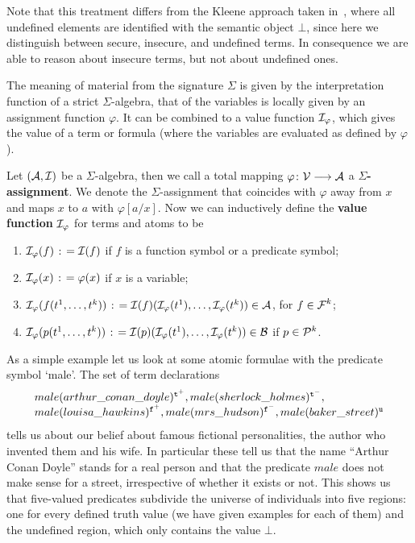 \documentclass{\filespath jancl}
\def\Vars{{\cV}}                      %
\def\Funcs{{\mbox{$\cF$}}}
\def\to{\longrightarrow}
\def\deq{{\;\colon\kern-.2em=\;}}
\def\phi{\varphi}
\def\cA{{\cal A}}\def\cB{{\cal B}}\def\cC{{\cal C}}
\def\cV{{\cal V}}\def\cW{{\cal W}}\def\cX{{\cal X}}
\let\phi\varphi
\newcommand{\undefined}{{\tt u}}
\newcommand{\twts}{{{\tt t}^+}}
\newcommand{\twfs}{{{\tt f}^+}}
\newcommand{\twti}{{{\tt t}^-}}
\newcommand{\twfi}{{{\tt f}^-}}
\newcommand{\Tval}{{\cal B}}
\def\Preds{{\cal P}}
\begin{document}
  Note that this treatment differs from the Kleene approach taken
  in~\cite{KeKo94}, where all undefined elements are identified
  with the semantic object $\bot$, since here we distinguish between
  secure, insecure, and undefined terms.  In consequence we are able
  to reason about insecure terms, but not about undefined ones.

The meaning of material from the signature $\Sigma$ is given by the
interpretation function of a strict $\Sigma$-algebra, that of the variables is
locally given by an assignment function $\phi$. It can be combined to
a value function $\cI_{\phi}$, which gives the value of a term or formula
(where the variables are evaluated as defined by $\phi$). 

\begin{definition}
  Let $(\cA,\cI)$ be a $\Sigma$-algebra, then we call a total mapping
  $\phi\colon\Vars\to\cA$ a {\bf $\Sigma$-assignment}. We denote the
  $\Sigma$-as\-sign\-ment that coincides with $\phi$ away from $x$ and
  maps $x$ to $a$ with $\phi[a/x]$.
  Now we can inductively define the {\bf value function} $\cI_\phi$ for terms
  and atoms to be
    \begin{enumerate}
  \item $\cI_\phi(f)\deq\cI(f)$ if $f$ is a function symbol or a predicate symbol;
  \item $\cI_\phi(x)\deq\phi(x)$ if $x$ is a variable;
  \item
    $\cI_\phi(f(t^1,\ldots,t^k))\deq\cI(f)(\cI_\phi(t^1),\ldots,\cI_\phi(t^k))\in\cA$,
    for $f\in\Funcs^k$;
  \item
    $\cI_\phi(p(t^1,\ldots,t^k))\deq\cI(p)(\cI_\phi(t^1),\ldots,\cI_\phi(t^k))\in\Tval$
    if $p\in\Preds^k$.
    \end{enumerate}
\end{definition}


\begin{example}\label{ex:literature}
  As a simple example let us look at some atomic formulae with the predicate
  symbol `male'. The set of term declarations
  \[\begin{array}{l}male(arthur\_conan\_doyle)^{\twts},male(sherlock\_holmes)^{\twti},\\
                    male(louisa\_hawkins)^{\twfs},male(mrs\_hudson)^{\twfi},male(baker\_street)^{\undefined}
  \end{array}\]
  tells us about our belief about famous fictional personalities, the
  author who invented them and his wife. In particular these tell us that the
  name ``Arthur Conan Doyle'' stands for a real person
  and that the predicate $\textit{male}$ does not make sense for a street, irrespective
  of whether it exists or not. This shows
  us that five-valued predicates subdivide the universe of individuals into
  five regions: one for every defined truth value (we have given examples for
  each of them) and the undefined region, which only contains the value $\bot$.
\end{example}
\end{document}
